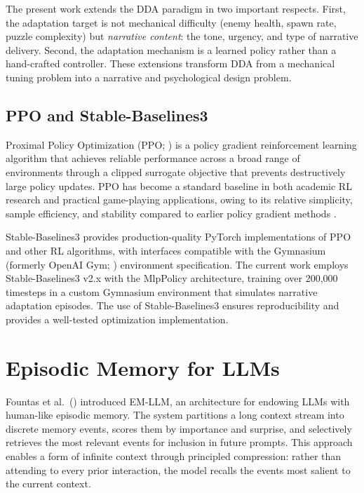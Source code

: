 \documentclass[12pt,a4paper]{report}
\begin{document}
The present work extends the DDA paradigm in two important respects. First, the adaptation target is not mechanical difficulty (enemy health, spawn rate, puzzle complexity) but \textit{narrative content}: the tone, urgency, and type of narrative delivery. Second, the adaptation mechanism is a learned policy rather than a hand-crafted controller. These extensions transform DDA from a mechanical tuning problem into a narrative and psychological design problem.

\subsection{PPO and Stable-Baselines3}

Proximal Policy Optimization (PPO; \citealp{schulman2017proximal}) is a policy gradient reinforcement learning algorithm that achieves reliable performance across a broad range of environments through a clipped surrogate objective that prevents destructively large policy updates. PPO has become a standard baseline in both academic RL research and practical game-playing applications, owing to its relative simplicity, sample efficiency, and stability compared to earlier policy gradient methods \citep{mnih2015human}.

Stable-Baselines3 \citep{raffin2021stable} provides production-quality PyTorch implementations of PPO and other RL algorithms, with interfaces compatible with the Gymnasium (formerly OpenAI Gym; \citealp{brockman2016openai}) environment specification. The current work employs Stable-Baselines3 v2.x with the MlpPolicy architecture, training over 200,000 timesteps in a custom Gymnasium environment that simulates narrative adaptation episodes. The use of Stable-Baselines3 ensures reproducibility and provides a well-tested optimization implementation.

\section{Episodic Memory for LLMs}

Fountas et al.\ (\citeyear{fountas2024episodic}) introduced EM-LLM, an architecture for endowing LLMs with human-like episodic memory. The system partitions a long context stream into discrete memory events, scores them by importance and surprise, and selectively retrieves the most relevant events for inclusion in future prompts. This approach enables a form of infinite context through principled compression: rather than attending to every prior interaction, the model recalls the events most salient to the current context.
\end{document}
